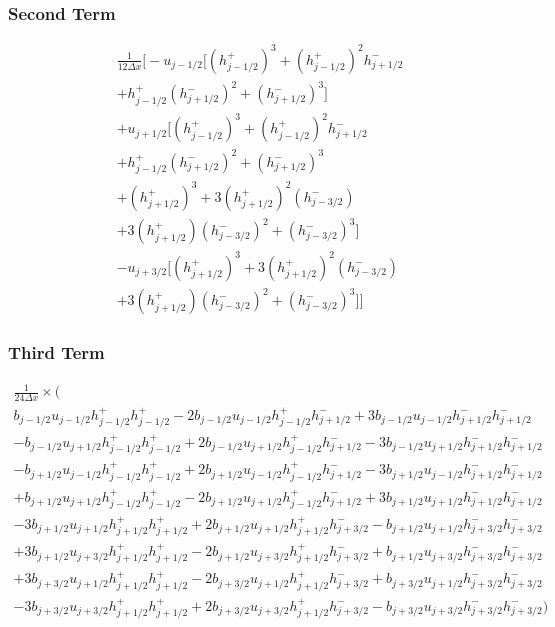 \documentclass[12pt]{article}
\begin{document}
\subsubsection{Second Term}

 \begin{multline}
\frac{1}{12\Delta x} \bigg[ -u_{j- 1/2}\bigg[ \left(h^+_{j- 1/2}\right)^3 + \left(h^+_{j- 1/2}\right)^2h^-_{j+ 1/2} \\ + h^+_{j- 1/2}\left(h^-_{j+ 1/2}\right)^2 +\left(h^-_{j+ 1/2}\right)^3\bigg] \\+u_{j+1/2}\bigg[\left(h^+_{j- 1/2}\right)^3  + \left(h^+_{j- 1/2}\right)^2h^-_{j+ 1/2} \\ + h^+_{j- 1/2}\left(h^-_{j+ 1/2}\right)^2  + \left(h^-_{j+ 1/2}\right)^3  \\ +\left(h^+_{j+ 1/2}\right)^3 + 3\left(h^+_{j+ 1/2}\right)^2\left(h^-_{j- 3/2}\right)\\ + 3\left(h^+_{j+ 1/2}\right) \left(h^-_{j- 3/2}\right)^2 +\left(h^-_{j- 3/2}\right)^3  \bigg] \\-u_{j+3/2} \bigg[\left(h^+_{j+ 1/2}\right)^3 + 3\left(h^+_{j+ 1/2}\right)^2\left(h^-_{j- 3/2}\right)\\ + 3\left(h^+_{j+ 1/2}\right) \left(h^-_{j- 3/2}\right)^2 +\left(h^-_{j- 3/2}\right)^3  \bigg]   \bigg]
 \end{multline}
 
 \subsubsection{Third Term}
 
 \begin{multline}
 \frac{1}{24\Delta x} \times \bigg(\\b_{j-1/2}u_{j-1/2} h^+_{j-1/2}h^+_{j-1/2} - 2b_{j-1/2}u_{j-1/2}h^+_{j-1/2}h^-_{j+1/2} +3 b_{j-1/2}u_{j-1/2}h^-_{j+1/2}h^-_{j+1/2}  \\- b_{j-1/2}u_{j+1/2}h^+_{j-1/2}h^+_{j-1/2} + 2b_{j-1/2}u_{j+1/2}h^+_{j-1/2}h^-_{j+1/2} - 3b_{j-1/2}u_{j+1/2}h^-_{j+1/2}h^-_{j+1/2}  \\ -b_{j+1/2} u_{j-1/2}h^+_{j-1/2}h^+_{j-1/2}  + 2b_{j+1/2} u_{j-1/2}h^+_{j-1/2}h^-_{j+1/2} -3 b_{j+1/2} u_{j-1/2}h^-_{j+1/2}h^-_{j+1/2} \\+  b_{j+1/2}u_{j+1/2}h^+_{j-1/2}h^+_{j-1/2} - 2b_{j+1/2}u_{j+1/2}h^+_{j-1/2}h^-_{j+1/2}+ 3b_{j+1/2}u_{j+1/2}h^-_{j+1/2}h^-_{j+1/2} \\
 -3b_{j+1/2}u_{j+1/2} h^+_{j+1/2}h^+_{j+1/2}+ 2b_{j+1/2}u_{j+1/2} h^+_{j+1/2}h^-_{j+3/2} - b_{j+1/2}u_{j+1/2} h^-_{j+3/2}h^-_{j+3/2}  \\ + 3b_{j+1/2}u_{j+3/2}h^+_{j+1/2}h^+_{j+1/2} -2b_{j+1/2}u_{j+3/2}h^+_{j+1/2}h^-_{j+3/2}  + b_{j+1/2}u_{j+3/2}h^-_{j+3/2}h^-_{j+3/2} \\+ 3b_{j+3/2} u_{j+1/2}h^+_{j+1/2}h^+_{j+1/2} - 2b_{j+3/2} u_{j+1/2}h^+_{j+1/2}h^-_{j+3/2} + b_{j+3/2} u_{j+1/2}h^-_{j+3/2}h^-_{j+3/2} \\-3b_{j+3/2} u_{j+3/2}h^+_{j+1/2}h^+_{j+1/2} + 2b_{j+3/2} u_{j+3/2}h^+_{j+1/2}h^-_{j+3/2} - b_{j+3/2} u_{j+3/2}h^-_{j+3/2}h^-_{j+3/2} \bigg)
 \end{multline}
 
\end{document}
